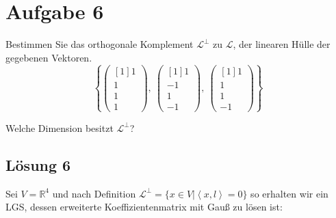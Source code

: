 \documentclass[main.tex]{subfiles}
\begin{document}
\arraycolsep=1pt %


\section{Aufgabe 6}
Bestimmen Sie das orthogonale Komplement $\mathcal{L}^{\perp }$ zu $\mathcal{L}$, der linearen Hülle der gegebenen Vektoren.
\begin{equation*}
    \left\{\begin{pmatrix}[1]
    1\\
    1\\
    1\\
    1
    \end{pmatrix} ,\ \begin{pmatrix}[1]
    1\\
    -1\\
    1\\
    -1
    \end{pmatrix} ,\ \begin{pmatrix}[1]
    1\\
    1\\
    1\\
    -1
    \end{pmatrix}\right\}
\end{equation*}

Welche Dimension besitzt $\mathcal{L}^{\perp }$?

\subsection{Lösung 6}
Sei $V=\mathbb{R}^{4}$ und nach Definition $\mathcal{L}^{\perp } =\{x \in V | \left\langle x,l \right\rangle =0\}$ so erhalten wir ein LGS, dessen erweiterte Koeffizientenmatrix mit Gauß zu lösen ist:
\end{document}
